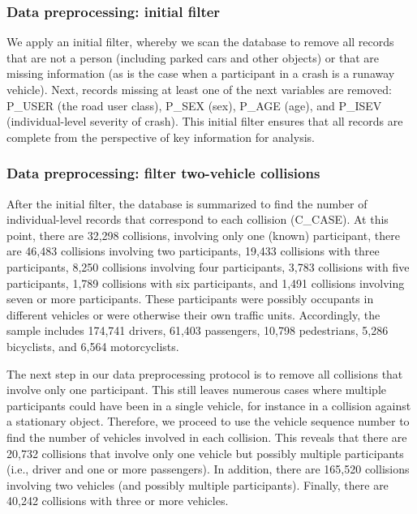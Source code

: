 \documentclass[]{elsarticle} %
\begin{document}
\endgroup{}

\hypertarget{data-preprocessing-initial-filter}{%
\subsubsection{Data preprocessing: initial
filter}\label{data-preprocessing-initial-filter}}

We apply an initial filter, whereby we scan the database to remove all
records that are not a person (including parked cars and other objects)
or that are missing information (as is the case when a participant in a
crash is a runaway vehicle). Next, records missing at least one of the
next variables are removed: P\_USER (the road user class), P\_SEX (sex),
P\_AGE (age), and P\_ISEV (individual-level severity of crash). This
initial filter ensures that all records are complete from the
perspective of key information for analysis.

\hypertarget{data-preprocessing-filter-two-vehicle-collisions}{%
\subsubsection{Data preprocessing: filter two-vehicle
collisions}\label{data-preprocessing-filter-two-vehicle-collisions}}

After the initial filter, the database is summarized to find the number
of individual-level records that correspond to each collision (C\_CASE).
At this point, there are 32,298 collisions, involving only one (known)
participant, there are 46,483 collisions involving two participants,
19,433 collisions with three participants, 8,250 collisions involving
four participants, 3,783 collisions with five participants, 1,789
collisions with six participants, and 1,491 collisions involving seven
or more participants. These participants were possibly occupants in
different vehicles or were otherwise their own traffic units.
Accordingly, the sample includes 174,741 drivers, 61,403 passengers,
10,798 pedestrians, 5,286 bicyclists, and 6,564 motorcyclists.

The next step in our data preprocessing protocol is to remove all
collisions that involve only one participant. This still leaves numerous
cases where multiple participants could have been in a single vehicle,
for instance in a collision against a stationary object. Therefore, we
proceed to use the vehicle sequence number to find the number of
vehicles involved in each collision. This reveals that there are 20,732
collisions that involve only one vehicle but possibly multiple
participants (i.e., driver and one or more passengers). In addition,
there are 165,520 collisions involving two vehicles (and possibly
multiple participants). Finally, there are 40,242 collisions with three
or more vehicles.
\end{document}
